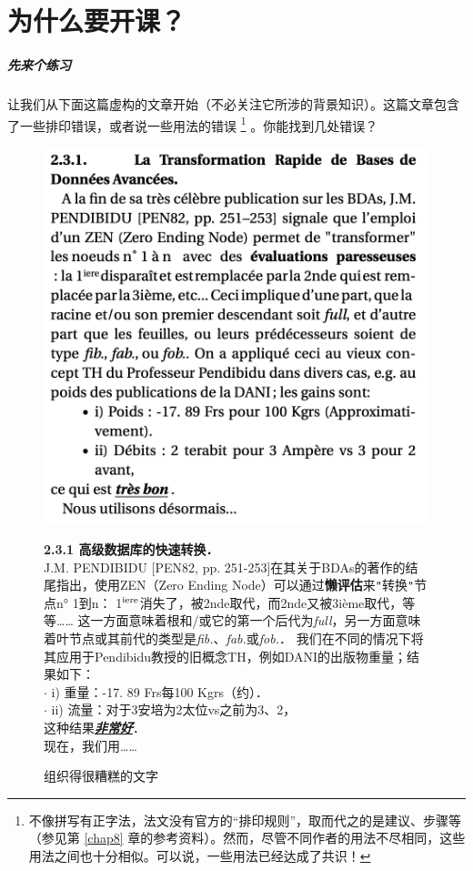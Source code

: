 \chapter{为什么要开课？}

\paragraph*{先来个练习}让我们从下面这篇虚构的文章开始（不必关注它所涉的背景知识）。这篇文章包含了一些排印错误，或者说一些用法的错误 
    \footnote{不像拼写有正字法，法文没有官方的``排印规则''，取而代之的是建议、步骤等（参见第 \ref{chap8} 章的参考资料）。然而，尽管不同作者的用法不尽相同，这些用法之间也十分相似。可以说，一些用法已经达成了共识！}
。你能找到几处错误？

\begin{figure}
    \centering
    \includegraphics[width = \linewidth]{img/1.png}

\begin{mdframed}
    \footnotesize
    \textbf{2.3.1 \quad 高级数据库的快速转换．}\\
    J.M. PENDIBIDU [PEN82, pp. 251-253]在其关于BDAs的著作的结尾指出，使用ZEN（Zero Ending Node）可以通过\textbf{懒评估}来\verb|"|转换\verb|"|节点n° 1到n：
    1$^{\rm iere}$消失了，被2nde取代，而2nde又被3ième取代，等等……
    这一方面意味着根和/或它的第一个后代为\emph{full}，另一方面意味着叶节点或其前代的类型是\emph{fib.}、\emph{fab.}或\emph{fob.}．
    我们在不同的情况下将其应用于Pendibidu教授的旧概念TH，例如DANI的出版物重量；结果如下：\\
    $\cdot$ i) 重量：-17. 89 Frs每100 Kgrs（约）．\\
    $\cdot$ ii) 流量：对于3安培为2太位vs之前为3、2，\\
    这种结果\textbf{\emph{\underline{非常好}}}．\\
    现在，我们用……
\end{mdframed}

    \caption{组织得很糟糕的文字}
    \label{fig1}
\end{figure}

